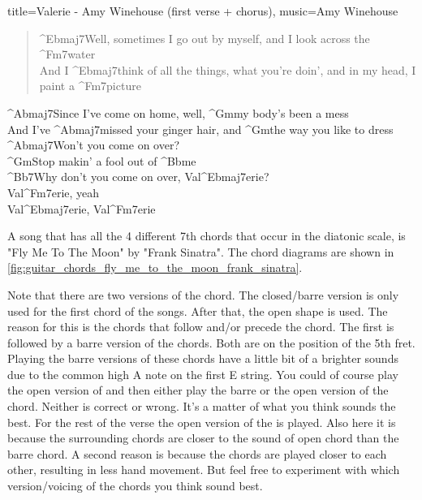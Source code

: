 \begin{song}[align-chords=l]{title={Valerie - Amy Winehouse (first verse + chorus)}, music={Amy Winehouse}}
	\begin{verse}
		^{Ebmaj7}Well, sometimes I go out by myself, and I look across the ^{Fm7}water \\
		And I ^{Ebmaj7}think of all the things, what you're doin', and in my head, I paint a ^{Fm7}picture \\
	\end{verse}
	\begin{chorus}
		^{Abmaj7}Since I've come on home, well, ^{Gm}my body's been a mess \\
		And I've ^{Abmaj7}missed your ginger hair, and ^{Gm}the way you like to dress \\
		^{Abmaj7}Won't you come on over? \\
		^{Gm}Stop makin' a fool out of ^{Bb}me \\
		^{Bb7}Why don't you come on over, Val^{Ebmaj7}erie? \\
		Val^{Fm7}erie, yeah \\
		Val^{Ebmaj7}erie, Val^{Fm7}erie \\
	\end{chorus}
\end{song}

\newpage

A song that has all the 4 different 7th chords that occur in the diatonic scale, is "Fly Me To The Moon" by "Frank Sinatra". The chord diagrams are shown in \autoref{fig:guitar_chords_fly_me_to_the_moon_frank_sinatra}.

Note that there are two versions of the  chord. The closed/barre version is only used for the first chord of the songs. After that, the open shape is used. The reason for this is the chords that follow and/or precede the  chord. The first  is followed by a barre version of the  chords. Both are on the position of the 5th fret. Playing the barre versions of these chords have a little bit of a brighter sounds due to the common high A note on the first E string. You could of course play the open version of  and then either play the barre or the open version of the  chord. Neither is correct or wrong. It's a matter of what you think sounds the best. For the rest of the verse the open version of the  is played. Also here it is because the surrounding chords are closer to the sound of open  chord than the barre chord. A second reason is because the chords are played closer to each other, resulting in less hand movement. But feel free to experiment with which version/voicing of the chords you think sound best.

